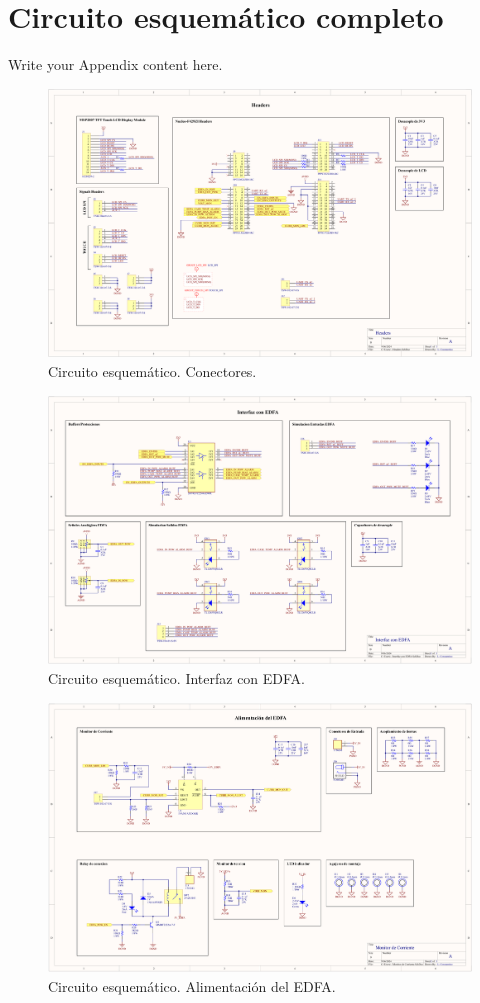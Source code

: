 
\chapter{Circuito esquemático completo} %

\label{AppendixA} %

Write your Appendix content here.

\begin{figure}[H]
\centering
\includegraphics[width=1.7\textwidth]{./Figures/circ1.png}
\caption{Circuito esquemático. Conectores.}
\end{figure}

\begin{figure}[H]
\centering
\includegraphics[width=1.7\textwidth]{./Figures/circ2.png}
\caption{Circuito esquemático. Interfaz con EDFA.}
\end{figure}

\begin{figure}[H]
\centering
\includegraphics[width=1.7\textwidth]{./Figures/circ3.png}
\caption{Circuito esquemático. Alimentación del EDFA.}
\end{figure}
